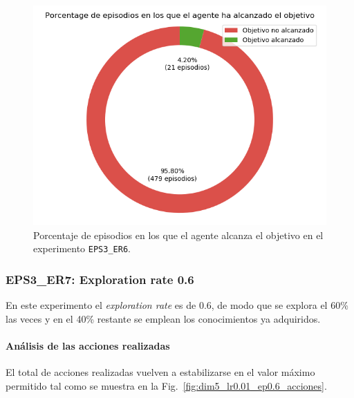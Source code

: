 \begin{figure}
    \centering
    \includegraphics[scale=0.4]{cap5_experimentacion/images/dim5_lr0.01_ep0.5_porcentajeResuelto.png}
    \caption{Porcentaje de episodios en los que el agente alcanza el objetivo en el experimento \texttt{EPS3\_ER6}.}
    \label{fig:dim5_lr0.01_ep0.5_porcentajeResuelto}
\end{figure}

\subsubsection{EPS3\_ER7: Exploration rate 0.6} \label{EPS3_ER7}

En este experimento el \textit{exploration rate} es de 0.6, de modo que se explora el 60\% las veces y en el 40\% restante se emplean los conocimientos ya adquiridos. \\

\paragraph{Análisis de las acciones realizadas}

El total de acciones realizadas vuelven a estabilizarse en el valor máximo permitido tal como se muestra en la Fig.~\ref{fig:dim5_lr0.01_ep0.6_acciones}. \\


